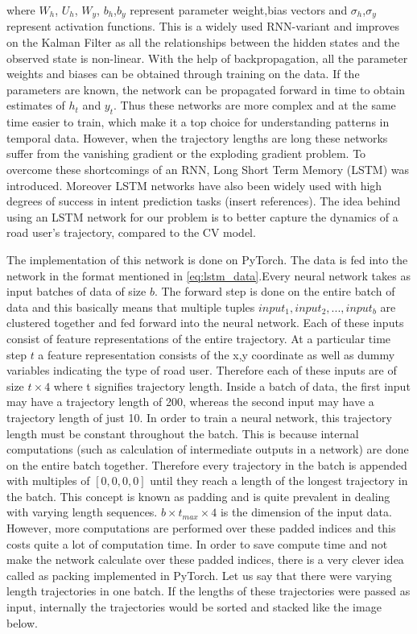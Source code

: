 \documentclass{article}
\begin{document}
where $W_h$, $U_h$, $W_y$, $b_h$,$b_y$ represent parameter weight,bias vectors and $\sigma_h$,$\sigma_y$ represent activation functions. This is a widely used RNN-variant and improves on the Kalman Filter as all the relationships between the hidden states and the observed state is non-linear. With the help of backpropagation, all the parameter weights and biases can be obtained through training on the data. If the parameters are known, the network can be propagated forward in time to obtain estimates of $h_t$ and $y_t$. Thus these networks are more complex and at the same time easier to train, which make it a top choice for understanding patterns in temporal data. However, when the trajectory lengths are long these networks suffer from the vanishing gradient or the exploding gradient problem.  To overcome these shortcomings of an RNN, Long Short Term Memory (LSTM) was introduced. Moreover LSTM networks have also been widely used with high degrees of success in intent prediction tasks (insert references). The idea behind using an LSTM network for our problem is to better capture the dynamics of a road user's trajectory, compared to the CV model. 

The implementation of this network is done on PyTorch. The data is fed into the network in the format mentioned in \ref{eq:lstm_data}.Every neural network takes as input batches of data of size $b$. The forward step is done on the entire batch of data and this basically means that multiple tuples $input_1,input_2,...,input_b$ are clustered together and fed forward into the neural network. Each of these inputs consist of feature representations of the entire trajectory. At a particular time step $t$ a feature representation consists of the x,y coordinate as well as dummy variables indicating the type of road user. Therefore each of these inputs are of size $t \times 4$ where t signifies trajectory length. Inside a batch of data, the first input may have a trajectory length of 200, whereas the second input may have a trajectory length  of just 10. In order to train a neural network, this trajectory length must be constant throughout the batch. This is because internal computations (such as calculation of intermediate outputs in a network) are done on the entire batch together. Therefore every trajectory in the batch is appended with multiples of $[0,0,0,0]$ until they reach a length of the longest trajectory in the batch. This concept is known as padding and is quite prevalent in dealing with varying length sequences. $b\times t_{max} \times 4$ is the dimension of the input data.   However, more computations are performed over these padded indices and this costs quite a lot of computation time. In order to save compute time and not make the network calculate over these padded indices, there is a very clever idea called as packing implemented in PyTorch. Let us say that there were varying length trajectories in one batch. If the lengths of these trajectories were passed as input, internally the trajectories would be sorted and stacked like the image below. 
\end{document}
